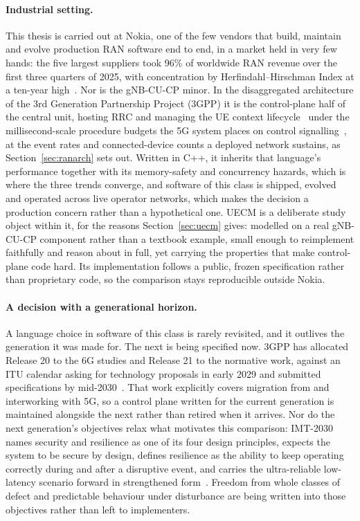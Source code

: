 \paragraph{Industrial setting.}
This thesis is carried out at Nokia, one of the few vendors that build, maintain and evolve
production RAN software end to end, in a market held in very few hands: the five largest
suppliers took 96\% of worldwide RAN revenue over the first three quarters of 2025, with
concentration by Herfindahl--Hirschman Index at a ten-year
high~\cite{delloro2025ran3q,delloro2026ran}. Nor is the gNB-CU-CP minor. In the disaggregated
architecture of the 3rd Generation Partnership Project (3GPP) it is the control-plane half of the
central unit, hosting RRC and managing the UE context lifecycle~\cite{3gpp38401,3gpp38331} under
the millisecond-scale procedure budgets the 5G system places on control
signalling~\cite{3gpp38913}, at the event rates and connected-device counts a deployed network
sustains, as Section~\ref{sec:ranarch} sets out. Written in C++, it inherits that language's
performance together with its memory-safety and concurrency hazards, which is where the three
trends converge, and software of this class is shipped, evolved and operated across live operator
networks, which makes the decision a production concern rather than a hypothetical one. UECM is a
deliberate study object within it, for the reasons Section~\ref{sec:uecm} gives: modelled on a real
gNB-CU-CP component rather than a textbook example, small enough to reimplement faithfully and
reason about in full, yet carrying the properties that make control-plane code hard. Its
implementation follows a public, frozen specification rather than proprietary code, so the
comparison stays reproducible outside Nokia.

\paragraph{A decision with a generational horizon.}
A language choice in software of this class is rarely revisited, and it outlives the generation
it was made for. The next is being specified now. 3GPP has allocated Release 20 to the 6G studies
and Release 21 to the normative work, against an ITU calendar asking for technology proposals in
early 2029 and submitted specifications by mid-2030~\cite{3gpp2024road6g}. That work explicitly
covers migration from and interworking with 5G, so a control plane written for the current
generation is maintained alongside the next rather than retired when it arrives. Nor do
the next generation's objectives relax what motivates this comparison: IMT-2030 names security
and resilience as one of its four design principles, expects the system to be secure by design,
defines resilience as the ability to keep operating correctly during and after a disruptive
event, and carries the ultra-reliable low-latency scenario forward in strengthened
form~\cite{itu2023imt2030}. Freedom from whole classes of defect and predictable behaviour under
disturbance are being written into those objectives rather than left to implementers.

